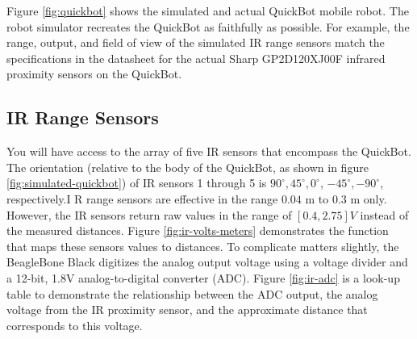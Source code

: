 \documentclass[10pt]{article}
\begin{document}
Figure \ref{fig:quickbot} shows the simulated and actual QuickBot mobile robot. The robot simulator recreates the QuickBot as faithfully as possible. For example, the range, output, and field of view of the simulated IR range sensors match the specifications in the datasheet for the actual Sharp GP2D120XJ00F infrared proximity sensors on the QuickBot.

\subsection{IR Range Sensors}\label{irprox}
You will have access to the array of five IR sensors that encompass the QuickBot. The orientation (relative to the body of the QuickBot, as shown in figure \ref{fig:simulated-quickbot}) of IR sensors 1 through 5 is $90^\circ, 45^\circ, 0^\circ$, $-45^\circ, -90^\circ$, respectively.I R range sensors are effective in the range $0.04$ m to $0.3$ m only. However, the IR sensors return raw values in the range of $[0.4,2.75] V$ instead of the measured distances. Figure \ref{fig:ir-volts-meters} demonstrates the function that maps these sensors values to distances. To complicate matters slightly, the BeagleBone Black digitizes the analog output voltage using a voltage divider and a 12-bit, 1.8V analog-to-digital converter (ADC). Figure \ref{fig:ir-adc} is a look-up table to demonstrate the relationship between the ADC output, the analog voltage from the IR proximity sensor, and the approximate distance that corresponds to this voltage.
\end{document}
